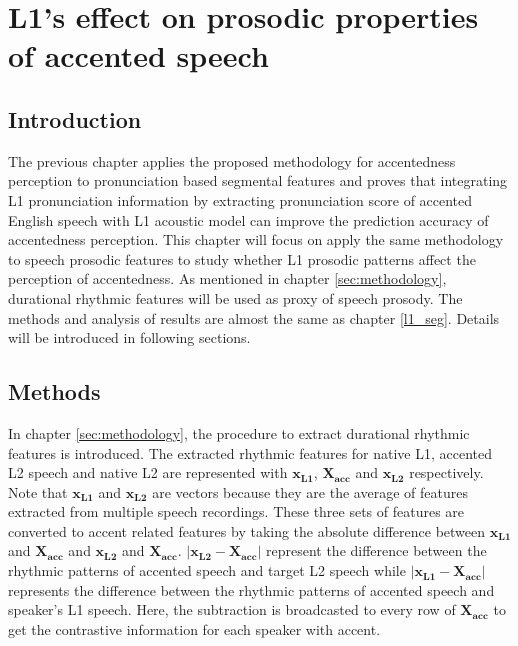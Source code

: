 \chapter{L1's effect on prosodic properties of accented speech}
\label{l1_supraseg}

\section{Introduction}

The previous chapter applies the proposed methodology for accentedness perception to pronunciation based segmental features and proves that integrating L1 pronunciation information by extracting pronunciation score of accented English speech with L1 acoustic model can improve the prediction accuracy of accentedness perception. This chapter will focus on apply the same methodology to speech prosodic features to study whether L1 prosodic patterns affect the perception of accentedness. As mentioned in chapter \ref{sec:methodology}, durational rhythmic features will be used as proxy of speech prosody. The methods and analysis of results are almost the same as chapter \ref{l1_seg}. Details will be introduced in following sections.

\section{Methods}

In chapter \ref{sec:methodology}, the procedure to extract durational rhythmic features is introduced. The extracted rhythmic features for native L1, accented L2 speech and native L2 are represented with $\mathbf{x_{L1}}$, $\mathbf{X_{acc}}$ and $\mathbf{x_{L2}}$ respectively. Note that $\mathbf{x_{L1}}$ and $\mathbf{x_{L2}}$ are vectors because they are the average of features extracted from multiple speech recordings. These three sets of features are converted to accent related features by taking the absolute difference between $\mathbf{x_{L1}}$ and $\mathbf{X_{acc}}$ and $\mathbf{x_{L2}}$ and $\mathbf{X_{acc}}$. $\left| \mathbf{x_{L2}}-\mathbf{X_{acc}} \right|$ represent the difference between the rhythmic patterns of accented speech and target L2 speech while $\left| \mathbf{x_{L1}}- \mathbf{X_{acc}} \right|$ represents the difference between the rhythmic patterns of accented speech and speaker's L1 speech. Here, the subtraction is broadcasted to every row of $\mathbf{X_{acc}}$ to get the contrastive information for each speaker with accent.


